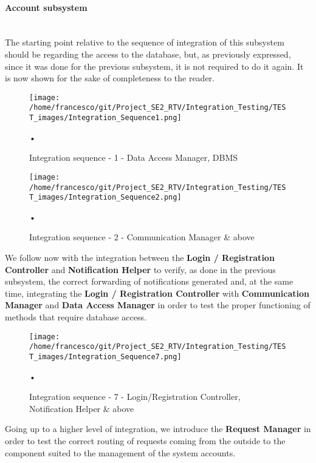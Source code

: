 \documentclass[10pt, a4paper,titlepage]{article}
\begin{document}
\paragraph{Account subsystem}\mbox{}\\
The starting point relative to the sequence of integration of this subsystem should be regarding the access to the database, but, as previously expressed, since it was done for the previous subsystem, it is not required to do it again. It is now shown for the sake of completeness to the reader.
\begin{figure}[h]
\begin{center}
\texttt{[image: /home/francesco/git/Project\_SE2\_RTV/Integration\_Testing/TEST\_images/Integration\_Sequence1.png]}
\caption{Integration sequence - 1 - Data Access Manager, DBMS}
\label{fig:int_seq1_1}
\end{center}•
\end{figure}
\begin{figure}[h]
\begin{center}
\texttt{[image: /home/francesco/git/Project\_SE2\_RTV/Integration\_Testing/TEST\_images/Integration\_Sequence2.png]}
\caption{Integration sequence - 2 - Communication Manager \& above}
\label{fig:int_seq2_1}
\end{center}•
\end{figure}
\pagebreak
\linebreak
We follow now with the integration between the \textbf{Login / Registration Controller} and \textbf{Notification Helper} to verify, as done in the previous subsystem, the correct forwarding of notifications generated and, at the same time, integrating  the \textbf{Login / Registration Controller} with \textbf{Communication Manager} and \textbf{Data Access Manager} in order to test the proper functioning of methods that require database access.
\begin{figure}[h]
\begin{center}
\texttt{[image: /home/francesco/git/Project\_SE2\_RTV/Integration\_Testing/TEST\_images/Integration\_Sequence7.png]}
\caption{Integration sequence - 7 - Login/Registration Controller, Notification Helper \& above}
\label{fig:int_seq7}
\end{center}•
\end{figure}
\linebreak
Going up to a higher level of integration, we introduce the \textbf{Request Manager} in order to test the correct routing of requests coming from the outside to the component suited to the management of the system accounts.
\end{document}
